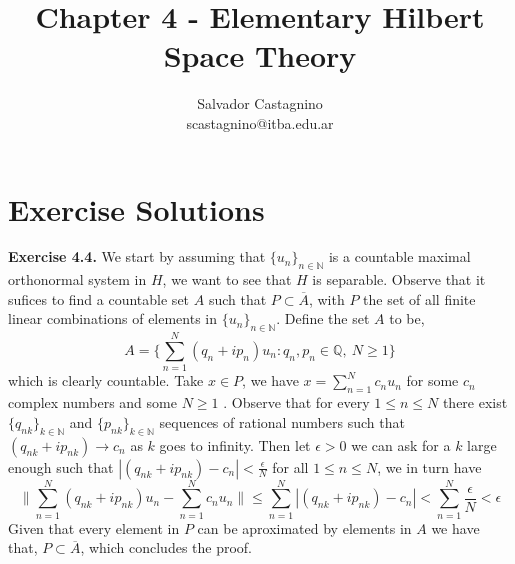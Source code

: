 \documentclass{article}
\author{Salvador Castagnino \\ scastagnino@itba.edu.ar}
\date{}
\title{Chapter 4 - Elementary Hilbert Space Theory}
\begin{document}
\maketitle

\section*{Exercise Solutions}

\begin{exercise}\textbf{Exercise 4.4.}
    We start by assuming that $\{u_n\}_{n \in \mathbb{N}}$ is a countable maximal orthonormal system in $H$, we want to see that $H$ is separable. Observe that it sufices to find a countable set $A$ such that $P \subset \overline{A}$, with $P$ the set of all finite linear combinations of elements in $\{u_n\}_{n \in \mathbb{N}}$. Define the set $A$ to be,
    \[
        A = \Bigg\{ \sum_{n=1}^{N} \left( q_n + i p_n \right)  u_n : q_n,p_n \in \mathbb{Q},\ N \ge 1\Bigg\} 
    \]
    which is clearly countable. Take $x \in P$, we have $x = \sum_{n=1}^{N} c_n u_n $ for some $c_n$ complex numbers and some $N \ge 1$ . Observe that for every $1 \le n \le N$ there exist $\{q_{nk}\}_{k \in \mathbb{N}}$ and $\{p_{nk}\}_{k \in \mathbb{N}}$ sequences of rational numbers such that $ \left( q_{nk} + i p_{nk} \right) \rightarrow c_n$ as $k$ goes to infinity. Then let $\epsilon > 0$ we can ask for a $k$ large enough such that $|\left( q_{nk} + i p_{nk} \right) - c_n| < \frac{\epsilon}{N}$ for all $1 \le n \le N$, we in turn have
    \[
        \|\sum_{n=1}^{N} \left( q_{nk} + i p_{nk} \right)u_n - \sum_{n=1}^{N} c_n u_n \| \le \sum_{n=1}^{N} |\left( q_{nk} + i p_{nk} \right) - c_n| < \sum_{n=1}^{N} \frac{\epsilon}{N} < \epsilon 
    \]
    Given that every element in $P$ can be aproximated by elements in $A$ we have that, $P \subset \overline{A}$, which concludes the proof.

\bigbreak


\end{exercise}
\end{document}
